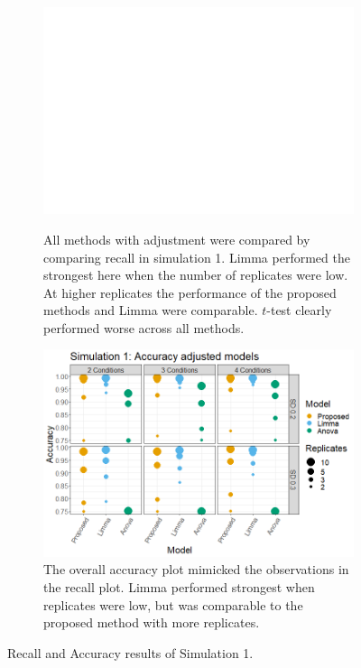 \documentclass{mcp}
\begin{document}
\begin{figure}[h!]
\centering
 \begin{subfigure}{\textwidth}
  \centering
	\includegraphics[width=.8\textwidth]{sim_new/sim1_Recall}\\
	\caption{All methods with adjustment were compared by comparing recall in simulation 1. Limma performed the strongest here when the number of replicates were low. At higher replicates the performance of the proposed methods and Limma were comparable. $t$-test clearly performed worse across all methods.}
 \end{subfigure}
 \begin{subfigure}{\textwidth}
  \centering
	\includegraphics[width=.8\textwidth]{sim_new/sim1_accuracy}
	\caption{The overall accuracy plot mimicked the observations in the recall plot. Limma performed strongest when replicates were low, but was comparable to the proposed method with more replicates.}
 \end{subfigure}
\caption{Recall and Accuracy results of Simulation 1.}
\label{fig:sim1_recall}
\end{figure}
\end{document}
